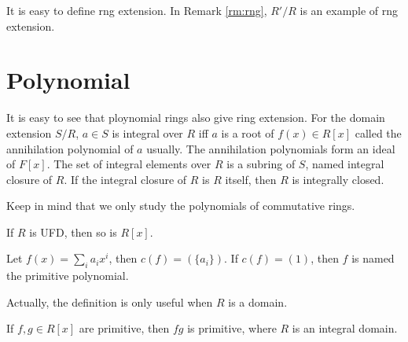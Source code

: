 \documentclass[11pt,a4paper,fleqn]{article}
\begin{document}
\begin{remark}
  It is easy to define rng extension. In Remark \ref{rm:rng}, $R'/R$ is an example of rng extension.
\end{remark}


\section{Polynomial}
It is easy to see that ploynomial rings also give ring extension. For the domain extension $S/R$, $a\in S$ is integral over $R$ iff $a$ is a root of $f(x)\in R[x]$ called the annihilation polynomial of $a$ usually. The annihilation polynomials form an ideal of $F[x]$. The set of integral elements over $R$ is a subring of $S$, named integral closure of $R$. If the integral closure of $R$ is $R$ itself, then $R$ is integrally closed.

Keep in mind that we only study the polynomials of commutative rings.
\begin{theorem}
 If $R$ is UFD, then so is $R[x]$.
\end{theorem}

\begin{definition}
Let $f(x)=\sum_ia_ix^i$, then $c(f)=(\{a_i\})$. If $c(f)=(1)$, then $f$ is named the primitive polynomial.
\end{definition}
Actually, the definition is only useful when $R$ is a domain.

\begin{lemma}[Gauss]
  If $f,g\in R[x]$ are primitive, then $fg$ is primitive, where $R$ is an integral domain.
\end{lemma}
\end{document}
